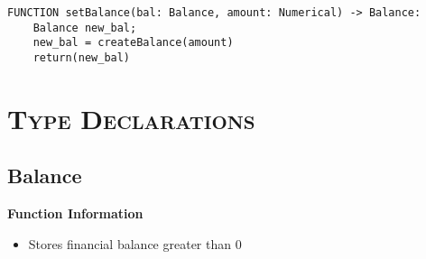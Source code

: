 \begin{verbatim}
FUNCTION setBalance(bal: Balance, amount: Numerical) -> Balance:
	Balance new_bal;
	new_bal = createBalance(amount)
	return(new_bal)
\end{verbatim}


\section{\textsc{Type Declarations}}

\subsection{Balance}
\textbf{Function Information}
\begin{itemize}
	\setlength{\itemsep}{5pt}
	\setlength{\parskip}{0pt}
	\setlength{\parsep}{0pt}
	\item Stores financial balance greater than 0
\end{itemize}


